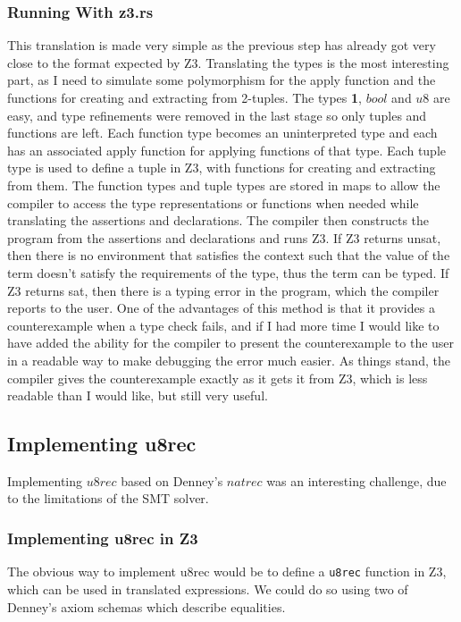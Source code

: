 \subsubsection{Running With z3.rs}

This translation is made very simple as the previous step has already got very close to the format
expected by Z3.
Translating the types is the most interesting part, as I need to simulate some polymorphism for
the apply function and the functions for creating and extracting from 2-tuples.
The types \textbf{1}, $bool$ and $u8$ are easy, and type refinements were removed in the last
stage so only tuples and functions are left.
Each function type becomes an uninterpreted type and each has an associated apply function for
applying functions of that type.
Each tuple type is used to define a tuple in Z3, with functions for creating and extracting from
them.
The function types and tuple types are stored in maps to allow the compiler to access the type
representations or functions when needed while translating the assertions and declarations.
The compiler then constructs the program from the assertions and declarations and runs Z3.
If Z3 returns unsat, then there is no environment that satisfies the context such that the value
of the term doesn't satisfy the requirements of the type, thus the term can be typed.
If Z3 returns sat, then there is a typing error in the program, which the compiler reports to the
user.
One of the advantages of this method is that it provides a counterexample when a type check fails,
and if I had more time I would like to have added the ability for the compiler to present the
counterexample to the user in a readable way to make debugging the error much easier.
As things stand, the compiler gives the counterexample exactly as it gets it from Z3, which is less
readable than I would like, but still very useful.

\subsection{Implementing u8rec}

Implementing $u8rec$ based on Denney's $natrec$ was an interesting challenge, due to the limitations
of the SMT solver.

\subsubsection{Implementing u8rec in Z3}

The obvious way to implement u8rec would be to define a \texttt{u8rec} function in Z3, which can be
used in translated expressions.
We could do so using two of Denney's axiom schemas which describe equalities.

